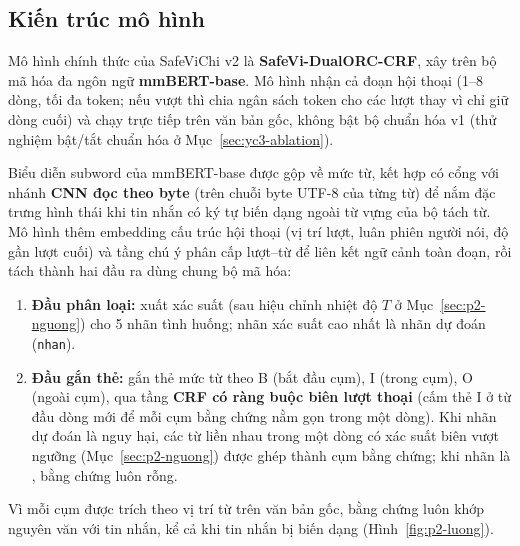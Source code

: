 \subsection{Kiến trúc mô hình}

Mô hình chính thức của SafeViChi v2 là \textbf{SafeVi-DualORC-CRF}, xây trên bộ mã hóa đa ngôn ngữ
\textbf{mmBERT-base}. Mô hình nhận cả đoạn hội thoại (1--8 dòng, tối đa  token; nếu vượt thì chia ngân
sách token cho các lượt thay vì chỉ giữ dòng cuối) và chạy trực tiếp trên văn bản gốc, không bật bộ chuẩn hóa v1 (thử
nghiệm bật/tắt chuẩn hóa ở Mục~\ref{sec:yc3-ablation}).

Biểu diễn subword của mmBERT-base được gộp về mức từ, kết hợp có cổng với nhánh \textbf{CNN đọc theo byte} (trên chuỗi
byte UTF-8 của từng từ) để nắm đặc trưng hình thái khi tin nhắn có ký tự biến dạng ngoài từ vựng của bộ tách từ. Mô hình
thêm embedding cấu trúc hội thoại (vị trí lượt, luân phiên người nói, độ gần lượt cuối) và tầng chú ý phân cấp lượt--từ
để liên kết ngữ cảnh toàn đoạn, rồi tách thành hai đầu ra dùng chung bộ mã hóa:

\begin{enumerate}
  \item \textbf{Đầu phân loại:} xuất xác suất (sau hiệu chỉnh nhiệt độ $T$ ở Mục~\ref{sec:p2-nguong}) cho 5 nhãn tình
        huống; nhãn xác suất cao nhất là nhãn dự đoán (\texttt{nhan}).
  \item \textbf{Đầu gắn thẻ:} gắn thẻ mức từ theo B (bắt đầu cụm), I (trong cụm), O (ngoài cụm), qua tầng
        \textbf{CRF có ràng buộc biên lượt thoại} (cấm thẻ I ở từ đầu dòng mới để mỗi cụm bằng chứng nằm gọn trong một
        dòng). Khi nhãn dự đoán là nguy hại, các từ liền nhau trong một dòng có xác suất biên vượt ngưỡng
        (Mục~\ref{sec:p2-nguong}) được ghép thành cụm bằng chứng; khi nhãn là , bằng chứng luôn rỗng.
\end{enumerate}

Vì mỗi cụm được trích theo vị trí từ trên văn bản gốc, bằng chứng luôn khớp nguyên văn với tin nhắn, kể cả khi tin nhắn
bị biến dạng (Hình~\ref{fig:p2-luong}).

